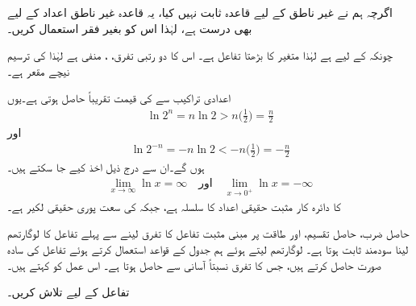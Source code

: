 اگرچہ ہم نے غیر ناطق  کے لیے قاعدہ  ثابت نہیں کیا، یہ قاعدہ غیر ناطق اعداد کے لیے بھی درست ہے،  لہٰذا اس کو بغیر فقر استعمال کریں۔ 

چونکہ  کے لیے   ہے لہٰذا  متغیر  کا بڑھتا تفاعل ہے۔ اس کا دو رتبی تفرق، ، منفی ہے لہٰذا  کی ترسیم نیچے مقعر ہے۔

اعدادی تراکیب سے   کی قیمت تقریباً  حاصل ہوتی ہے۔یوں
\begin{align*}
\ln 2^n=n\ln 2>n\big(\frac{1}{2}\big)=\frac{n}{2}
\end{align*}
اور
\begin{align*}
\ln 2^{-n}=-n\ln 2<-n\big(\frac{1}{2}\big)=-\frac{n}{2}
\end{align*}
ہوں گے۔ان سے درج ذیل اخذ کیے جا سکتے ہیں۔
\begin{align*}
\lim_{x\to \infty}\ln x=\infty\quad \text{اور}\quad \lim_{x\to 0^+}\ln x=-\infty
\end{align*}
 کا دائرہ کار مثبت حقیقی اعداد کا سلسلہ ہے،  جبکہ  کی سعت پوری حقیقی لکیر ہے۔

حاصل ضرب، حاصل تقسیم، اور طاقت  پر مبنی مثبت تفاعل کا تفرق لینے سے پہلے  تفاعل کا لوگارتھم لینا سودمند ثابت ہوتا ہے۔ لوگارتھم لیتے ہوئے ہم جدول  کے قواعد استعمال کرتے ہوئے تفاعل کی سادہ صورت حاصل کرتے ہیں،  جس کا تفرق نسبتاً آسانی سے حاصل ہوتا ہے۔ اس عمل کو  کہتے ہیں۔ 


تفاعل  کے لیے  تلاش کریں۔

